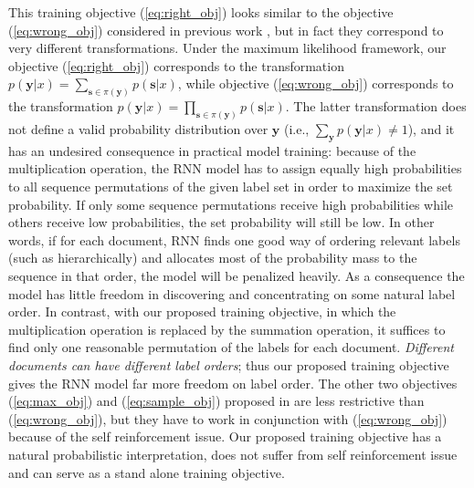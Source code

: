 This training objective (\ref{eq:right_obj}) looks similar to the objective (\ref{eq:wrong_obj}) considered in previous work \cite{vinyals2015order}, but in fact they correspond to very different transformations. Under the maximum likelihood framework, our objective (\ref{eq:right_obj}) corresponds to the transformation $p(\mathbf{y}|x)=\sum_{\mathbf{s}\in \pi(\mathbf{y})} p(\mathbf{s}|x)$, while objective (\ref{eq:wrong_obj}) corresponds to the transformation $p(\mathbf{y}|x)=\prod_{\mathbf{s}\in \pi(\mathbf{y})} p(\mathbf{s}|x)$. The latter transformation does not define a valid probability distribution over $\mathbf{y}$ (i.e., $\sum_{\mathbf{y}} p(\mathbf{y}|x)\neq 1$), and it has an undesired  consequence in practical model training: because of the multiplication operation, the RNN model has to assign equally high probabilities to all sequence permutations of the given label set in order to maximize the set probability.  If only some sequence permutations receive high probabilities while others receive low probabilities, the set probability will still be low. In other words, if for each document, RNN finds one  good way of ordering relevant labels (such as hierarchically) and allocates most of the probability mass to the sequence in that order, the model will be penalized heavily.  As a consequence the model has little freedom in discovering and concentrating on some natural label order. In contrast, with our proposed training objective, in which the multiplication operation is replaced by the  summation operation, it suffices to find only one reasonable permutation of the labels for each document. \emph{Different documents can have different label orders}; thus our proposed training objective gives the RNN model far more freedom on label order. The other two objectives (\ref{eq:max_obj}) and (\ref{eq:sample_obj}) proposed in \cite{vinyals2015order} are less restrictive than  (\ref{eq:wrong_obj}), but they have to work in conjunction with (\ref{eq:wrong_obj}) because of the self reinforcement issue. Our proposed training objective has a natural probabilistic interpretation, does not suffer from self reinforcement issue and can serve as a stand alone training objective. 

